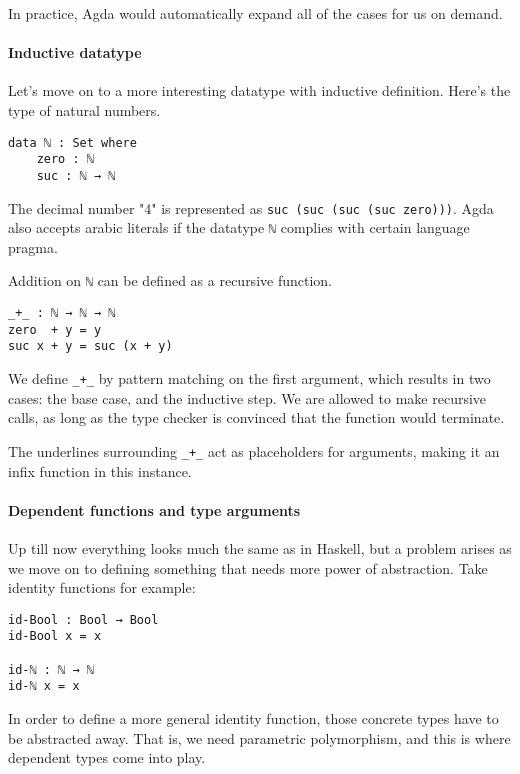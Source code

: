 \documentclass[../thesis.tex]{subfiles}
\begin{document}
In practice, Agda would automatically expand all of the cases for us on demand.

\paragraph{Inductive datatype} Let's move on to a more interesting datatype with
 inductive definition. Here's the type of natural numbers.
\begin{lstlisting}
data ℕ : Set where
    zero : ℕ
    suc : ℕ → ℕ
\end{lstlisting}

The decimal number "4" is represented as {\lstinline|suc (suc (suc (suc zero)))|}.
Agda also accepts arabic  literals if the datatype {\lstinline|ℕ|} complies with
certain language pragma.

Addition on {\lstinline|ℕ|} can be defined as a recursive function.

\begin{lstlisting}
_+_ : ℕ → ℕ → ℕ
zero  + y = y
suc x + y = suc (x + y)
\end{lstlisting}

We define {\lstinline|_+_|} by pattern matching on the first argument, which results
in two cases: the base case, and the inductive step. We are allowed to make
recursive calls, as long as the type checker is convinced that the function
would terminate.

The underlines surrounding {\lstinline|_+_|} act as placeholders for arguments, making
it an infix function in this instance.

\paragraph{Dependent functions and type arguments}
Up till now everything looks much the same as in Haskell, but a problem arises as
we move on to defining something that needs more power of abstraction. Take identity
functions for example:

\begin{lstlisting}
id-Bool : Bool → Bool
id-Bool x = x

id-ℕ : ℕ → ℕ
id-ℕ x = x
\end{lstlisting}

In order to define a more general identity function, those concrete types have
to be abstracted away. That is, we need parametric polymorphism, and this is
where dependent types come into play.
\end{document}
